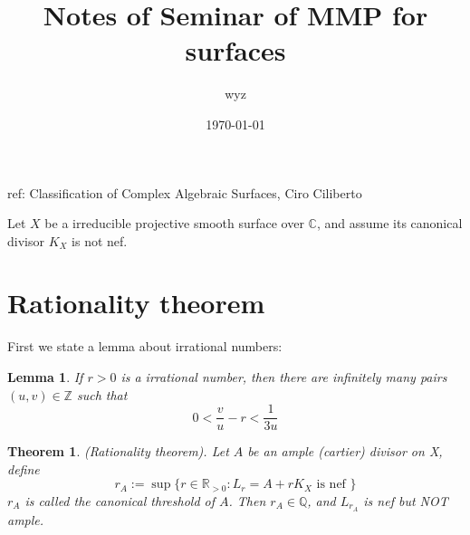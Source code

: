 \documentclass{article}
\title{Notes of Seminar of MMP for surfaces}
\author{wyz}
\date{\today}
\newtheorem{lem}[defn]{Lemma}
\newtheorem{thm}[defn]{Theorem}
\begin{document}

ref: Classification of Complex Algebraic Surfaces, Ciro Ciliberto
	
Let $ X $ be a irreducible projective smooth surface over $ \mathbb{C} $, and assume its canonical divisor $ K_X $ is not nef.
	
	
\section{Rationality theorem}

First we state a lemma about irrational numbers:
\begin{lem}
	If $ r>0 $ is a irrational number, then there are infinitely many pairs $ (u,v)\in \mathbb{Z} $ such that 
	$$ 0<\frac{v}{u}-r< \frac{1}{3u}$$
\end{lem}

\begin{thm}
	(Rationality theorem). Let $ A $ be an ample (cartier) divisor on X, define 
	$$ r_A:=\sup \{ r\in \mathbb{R}_{>0}:L_r=A+rK_X \text{ is nef  } \} $$
	$ r_A $ is called  the canonical threshold of $ A $. Then $ r_A\in \mathbb{Q} $, and $ L_{r_A} $ is nef but NOT ample.
\end{thm}
\end{document}
